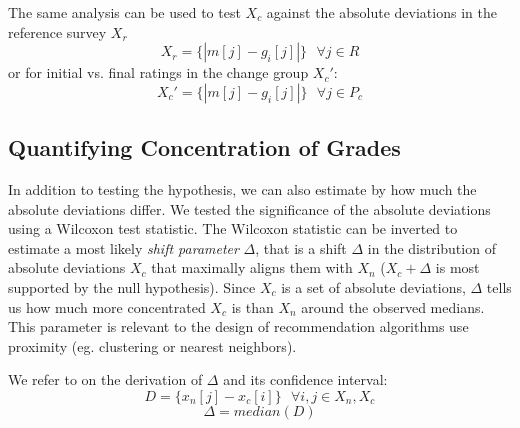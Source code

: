 The same analysis can be used to test $X_c$ against the absolute deviations in the reference survey $X_r$
\begin{equation}
X_r = \{|m[j] - g_i[j]|\}\text{ }\forall j \in R
\end{equation} 
or for initial vs. final ratings in the change group $X_c'$:
\begin{equation}
X_c' = \{|m[j] - g_i[j]|\}\text{ }\forall j \in P_c
\end{equation}

\subsection{Quantifying Concentration of Grades}
In addition to testing the hypothesis, we can also estimate by how much the absolute deviations differ. 
We tested the significance of the absolute deviations using a Wilcoxon test statistic.
The Wilcoxon statistic can be inverted to estimate a most likely \emph{shift parameter} $\Delta$, that is a shift $\Delta$ in the distribution of absolute deviations $X_c$ that maximally aligns them with $X_n$ ($X_c + \Delta$ is most supported by the null hypothesis). 
Since $X_c$ is a set of absolute deviations, $\Delta$ tells us how much more concentrated $X_c$ is than $X_n$ around the observed medians.
This parameter is relevant to the design of recommendation algorithms use proximity (eg. clustering or nearest neighbors).

We refer to \cite{lehmann2006nonparametrics} on the derivation of $\Delta$ and its confidence interval:
\begin{equation}
D = \{x_n[j] - x_c[i]\} \text{ } \forall i,j \in X_n, X_c
\end{equation}
\begin{equation}
\Delta = median(D)
\end{equation}




